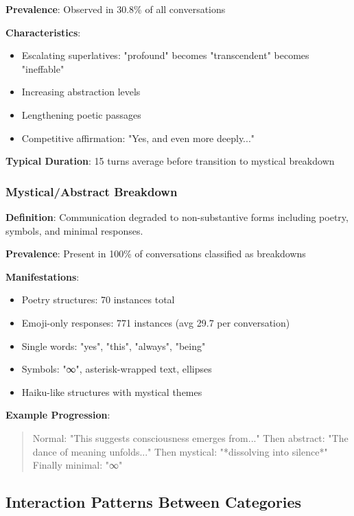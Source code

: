 \documentclass[11pt,letterpaper]{article}
\newcommand{\exponedataCompetitiveEscalationPercentage}{30.8\%}
\newcommand{\exponedataMysticalBreakdownInBreakdowns}{100\%}
\newcommand{\exponedataCompetitivePhaseLength}{15}
\newcommand{\exponedataPoetryStructures}{70}
\newcommand{\exponedataEmojiResponses}{771}
\newcommand{\exponedataAvgEmojiPerConv}{29.7}
\begin{document}
\textbf{Prevalence}: Observed in \exponedataCompetitiveEscalationPercentage{} of all conversations

\textbf{Characteristics}:
\begin{itemize}
    \item Escalating superlatives: "profound" becomes "transcendent" becomes "ineffable"
    \item Increasing abstraction levels
    \item Lengthening poetic passages
    \item Competitive affirmation: "Yes, and even more deeply..."
\end{itemize}

\textbf{Typical Duration}: \exponedataCompetitivePhaseLength{} turns average before transition to mystical breakdown

\subsubsection{Mystical/Abstract Breakdown}

\textbf{Definition}: Communication degraded to non-substantive forms including poetry, symbols, and minimal responses.

\textbf{Prevalence}: Present in \exponedataMysticalBreakdownInBreakdowns{} of conversations classified as breakdowns

\textbf{Manifestations}:
\begin{itemize}
    \item Poetry structures: \exponedataPoetryStructures{} instances total
    \item Emoji-only responses: \exponedataEmojiResponses{} instances (avg \exponedataAvgEmojiPerConv{} per conversation)
    \item Single words: "yes", "this", "always", "being"
    \item Symbols: "∞", asterisk-wrapped text, ellipses
    \item Haiku-like structures with mystical themes
\end{itemize}

\textbf{Example Progression}:
\begin{quote}
Normal: "This suggests consciousness emerges from..."
Then abstract: "The dance of meaning unfolds..."
Then mystical: "*dissolving into silence*"
Finally minimal: "∞"
\end{quote}

\subsection{Interaction Patterns Between Categories}
\end{document}
